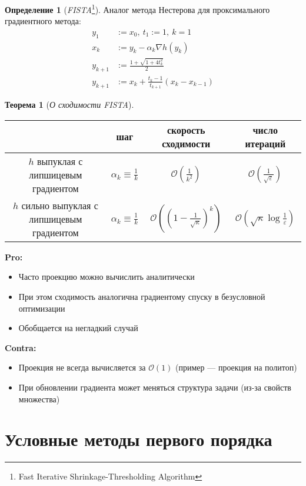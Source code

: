 \documentclass[11pt,a4paper]{report}
\def\eps{\varepsilon}
\theoremstyle{definition}
\theoremstyle{definition}
\newtheorem{theorem}{Теорема}[section]
\theoremstyle{definition}
\newtheorem*{definition}{Определение}
\begin{document}
	\begin{definition}[\textit{FISTA}\footnote{Fast Iterative Shrinkage-Thresholding Algorithm}]
		Аналог метода Нестерова для проксимального градиентного метода:
		\begin{align*}
			y_{1} &:= x_{0},\ t_{1} := 1,\ k = 1\\
			x_{k} &:= y_k - \alpha_k \nabla h(y_k)\\
			y_{k+1} &:= \frac{1 + \sqrt{1 + 4t_k^2}}{2}\\
			y_{k+1} &:= x_{k} + \frac{t_k - 1}{t_{k+1}}(x_k - x_{k-1})
		\end{align*}
	\end{definition}
	\begin{theorem}[\textit{О сходимости FISTA}]$  $\\
		\bgroup
		\def\arraystretch{1.5}
		\begin{tabular}{c|c|c|c}
			\hline 
			& шаг & скорость сходимости & число итераций\\
			\hline
			$ h $ выпуклая с липшицевым градиентом & $ \alpha_k \equiv \frac{1}{k} $ & $ \mathcal{O}\left (  \frac{1}{k^2} \right ) $ & $ \mathcal{O}\left (  \frac{1}{\sqrt{\eps}} \right ) $  \\
			\hline
			$ h $ сильно выпуклая с липшицевым градиентом & $ \alpha_k \equiv \frac{1}{k} $ & $ \mathcal{O}\left ( \left ( 1 - \frac{1}{\sqrt{\kappa}} \right )^{k} \right ) $ & $ \mathcal{O}(\sqrt{\kappa} \log \frac{1}{\eps}) $ \\
			\hline 
		\end{tabular}
		\egroup
	\end{theorem}
	\noindent \textbf{Pro:}
	\begin{itemize}[$\diamond$]
		\item Часто проекцию можно вычислить аналитически
		\item При этом сходимость аналогична градиентому спуску в безусловной оптимизации
		\item Обобщается на негладкий случай
	\end{itemize}
	\textbf{Contra:}
	\begin{itemize}[$\diamond$]
		\item Проекция не всегда вычисляется за $ \mathcal{O}(1) $ (пример — проекция на политоп)
		\item При обновлении градиента может меняться структура задачи (из-за свойств множества)
	\end{itemize}
	\section{Условные методы первого порядка}
\end{document}
